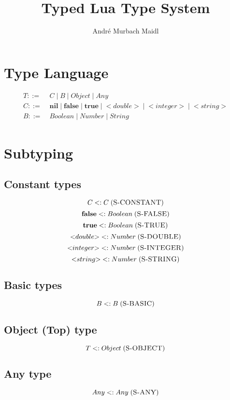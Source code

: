 \documentclass[12pt]{article}
\title{Typed Lua Type System}
\author{André Murbach Maidl}
\newcommand{\mylabel}[1]{\; (\textsc{#1})}
\newcommand{\subtype}{<:}
\begin{document}
\maketitle

\section{Type Language}

\begin{align*}
T ::= \; & C \; | \; B \; | \; Object \; | \; Any\\
C ::= \; & \mathbf{nil} \; | \; \mathbf{false} \; | \; \mathbf{true} \;
 | \; {<}double{>} \; | \; {<}integer{>} \; | \; {<}string{>}\\
B ::= \; & Boolean \; | \; Number \; | \; String\\
\end{align*}

\section{Subtyping}

\subsection{Constant types}

\[
C \subtype C \mylabel{S-CONSTANT}
\]
\[
\mathbf{false} \subtype Boolean \mylabel{S-FALSE}
\]
\[
\mathbf{true} \subtype Boolean \mylabel{S-TRUE}
\]
\[
{<}double{>} \subtype Number \mylabel{S-DOUBLE}
\]
\[
{<}integer{>} \subtype Number \mylabel{S-INTEGER}
\]
\[
{<}string{>} \subtype Number \mylabel{S-STRING}
\]

\subsection{Basic types}

\[
B \subtype B \mylabel{S-BASIC}
\]

\subsection{Object (Top) type}

\[
T \subtype Object \mylabel{S-OBJECT}
\]

\subsection{Any type}

\[
Any \subtype Any \mylabel{S-ANY}
\]
\end{document}
